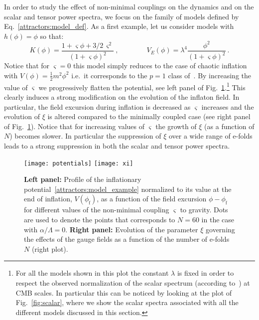 In order to study the effect of non-minimal couplings on the dynamics and on the scalar and tensor power spectra, we focus on the family of models defined by Eq.~\eqref{attractors:model_def}. As a first example, let us consider models with $h(\phi) = \phi$ so that:
\begin{equation}
	\label{attractors:model_example}
	K(\phi) = \frac{1+\varsigma \phi + 3/2 \, \varsigma^2 }{(1+\varsigma \phi)^2} \ , \qquad \qquad V_E(\phi) = \lambda^4 \frac{ \phi^2}{ \left( 1 + \varsigma \phi \right)^2} \ .
\end{equation}
Notice that for $\varsigma = 0 $ this model simply reduces to the case of chaotic inflation with $V(\phi) = \frac{1}{2} m^2 \phi^2$ i.e.\ it corresponds to the $p=1$ class of~\cite{Domcke:2016bkh}. 
By increasing the value of $\varsigma$ we progressively flatten the potential, see left panel of Fig.~\ref{fig:potentials_and_xi}.\footnote{For all the models shown in this plot the constant $\lambda$ is fixed in order to respect the observed normalization of the scalar spectrum (according to~\cite{Ade:2015lrj}) at CMB scales. In particular this can be noticed by looking at the plot of Fig.~\ref{fig:scalar}, where we show the scalar spectra associated with all the different models discussed in this section.} This clearly induces a strong modification on the evolution of the inflaton field. In particular, the field excursion during inflation is decreased as $\varsigma$ increases and the evolution of $\xi$ is altered compared to the minimally coupled case (see right panel of Fig.~\ref{fig:potentials_and_xi}).
 Notice that for increasing values of $\varsigma$ the growth of $\xi$ (as a function of $N$) becomes slower. In particular the suppression of $\xi$ over a wide range of e-folds leads to a strong suppression in both the scalar and tensor power spectra.

\begin{figure}
\centering
\texttt{[image: potentials]}
\texttt{[image: xi]}
\caption{\textbf{Left panel:} Profile of the inflationary potential~\eqref{attractors:model_example} normalized to its value at the end of inflation, $V(\phi_\textrm{f})$, as a function of the field excursion $\phi - \phi_\textrm{f}$ for different values of the non-minimal coupling $\varsigma$ to gravity. Dots are used to denote the points that corresponds to $N = 60$ in the case with $\alpha/\Lambda = 0$. \textbf{Right panel:} Evolution of the parameter $\xi$ governing the effects of the gauge fields as a function of the number of e-folds $N$ (right plot).}
\label{fig:potentials_and_xi}
\end{figure}


